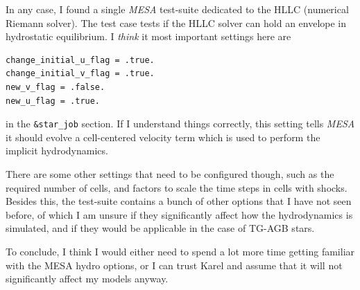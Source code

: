\documentclass[a4paper,10pt]{article}
\begin{document}
In any case, I found a single \emph{MESA} test-suite dedicated to the HLLC (numerical Riemann solver). The test case tests if the HLLC solver can hold an envelope in hydrostatic equilibrium. I \emph{think} it most important settings here are
\begin{verbatim}
change_initial_u_flag = .true.
change_initial_v_flag = .true.
new_v_flag = .false.
new_u_flag = .true.
\end{verbatim}
in the \lstinline[style=output, breaklines=true]|&star_job| section. If I understand things correctly, this setting tells \emph{MESA} it should evolve a cell-centered velocity term which is used to perform the implicit hydrodynamics.

There are some other settings that need to be configured though, such as the required number of cells, and factors to scale the time steps in cells with shocks. Besides this, the test-suite contains a bunch of other options that I have not seen before, of which I am unsure if they significantly affect how the hydrodynamics is simulated, and if they would be applicable in the case of TG-AGB stars.

To conclude, I think I would either need to spend a lot more time getting familiar with the MESA hydro options, or I can trust Karel and assume that it will not significantly affect my models anyway.



\end{document}
